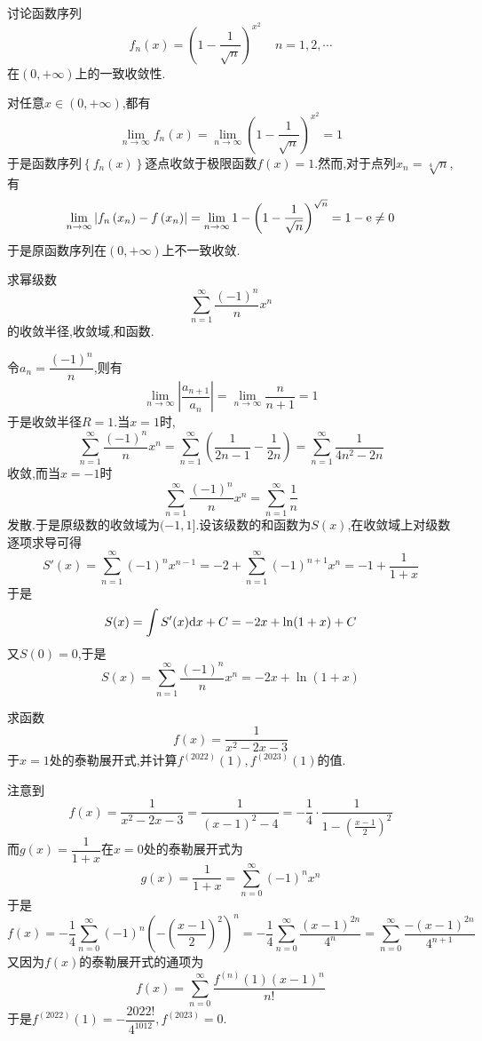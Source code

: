\documentclass{ctexart}
\begin{document}
\begin{problem}[2.(10\songti{分})]
    讨论函数序列
    \[f_n(x)=\left(1-\dfrac{1}{\sqrt{n}}\right)^{x^2}\ \ \ \ \ n=1,2,\cdots\]
    在$(0,+\infty)$上的一致收敛性.

\end{problem}
\begin{solution}
    对任意$x\in(0,+\infty)$,都有
    \[\lim_{n\to\infty}f_n(x)=\lim_{n\to\infty}\left(1-\dfrac{1}{\sqrt{n}}\right)^{x^2}=1\]
    于是函数序列$\left\{f_n(x)\right\}$逐点收敛于极限函数$f(x)=1$.然而,对于点列$x_n=\sqrt[4]{n}$,有
    \[\lim_{n\to\infty}\left|f_n\left(x_n\right)-f\left(x_n\right)\right|
    =\lim_{n\to\infty}1-\left(1-\dfrac{1}{\sqrt{n}}\right)^{\sqrt{n}}=1-\mathrm{e}\neq0\]
    于是原函数序列在$(0,+\infty)$上不一致收敛.
\end{solution}
\begin{problem}[3.(15\songti{分})]
    求幂级数
    \[\sum_{n=1}^{\infty}\dfrac{(-1)^n}{n}x^n\]
    的收敛半径,收敛域,和函数.

\end{problem}
\begin{solution}
    令$a_n=\dfrac{(-1)^n}{n}$,则有
    \[\lim_{n\to\infty}\left|\dfrac{a_{n+1}}{a_n}\right|
    =\lim_{n\to\infty}\dfrac{n}{n+1}=1\]
    于是收敛半径$R=1$.当$x=1$时,
    \[\sum_{n=1}^{\infty}\dfrac{(-1)^n}{n}x^n=\sum_{n=1}^{\infty}\left(\dfrac{1}{2n-1}-\dfrac{1}{2n}\right)=\sum_{n=1}^{\infty}\dfrac{1}{4n^2-2n}\]
    收敛,而当$x=-1$时
    \[\sum_{n=1}^{\infty}\dfrac{(-1)^n}{n}x^n=\sum_{n=1}^{\infty}\dfrac{1}{n}\]
    发散.于是原级数的收敛域为$(-1,1]$.设该级数的和函数为$S(x)$,在收敛域上对级数逐项求导可得
    \[S'(x)=\sum_{n=1}^{\infty}(-1)^nx^{n-1}=-2+\sum_{n=1}^{\infty}(-1)^{n+1}x^{n}=-1+\dfrac{1}{1+x}\]
    于是
    \[S(x)=\int S'(x)\mathrm{d} x+C=-2x+\ln(1+x)+C\]
    又$S(0)=0$,于是
    \[S(x)=\sum_{n=1}^{\infty}\dfrac{(-1)^n}{n}x^n=-2x+\ln(1+x)\]

\end{solution}
\begin{problem}[4.(10\songti{分})]
    求函数
    \[f(x)=\dfrac{1}{x^2-2x-3}\]
    于$x=1$处的泰勒展开式,并计算$f^{(2022)}(1),f^{(2023)}(1)$的值.
        
\end{problem}
\begin{solution}
    注意到
    \[f(x)=\dfrac{1}{x^2-2x-3}=\dfrac{1}{(x-1)^2-4}=-\dfrac14\cdot\dfrac{1}{1-\left(\frac{x-1}{2}\right)^2}\]
    而$g(x)=\dfrac{1}{1+x}$在$x=0$处的泰勒展开式为
    \[g(x)=\dfrac{1}{1+x}=\sum_{n=0}^{\infty}(-1)^nx^n\]
    于是
    \[f(x)=-\dfrac14\sum_{n=0}^{\infty}(-1)^n\left(-\left(\dfrac{x-1}{2}\right)^2\right)^n
    =-\dfrac14\sum_{n=0}^{\infty}\dfrac{(x-1)^{2n}}{4^n}=\sum_{n=0}^{\infty}\dfrac{-(x-1)^{2n}}{4^{n+1}}\]
    又因为$f(x)$的泰勒展开式的通项为
    \[f(x)=\sum_{n=0}^{\infty}\dfrac{f^{(n)}(1)(x-1)^n}{n!}\]
    于是$f^{(2022)}(1)=-\dfrac{2022!}{4^{1012}},f^{(2023)}=0$.
\end{solution}
\end{document}
